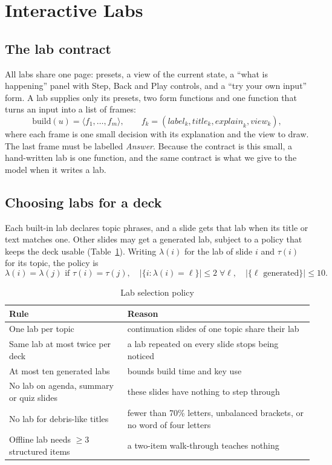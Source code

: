 \documentclass[runningheads]{llncs}
\begin{document}
\section{Interactive Labs}
\label{sec:labs}
\subsection{The lab contract}
All labs share one page: presets, a view of the current state, a ``what is happening'' panel with Step, Back and Play controls,
and a ``try your own input'' form. A lab supplies only its presets, two form functions and one function that turns an input into
a list of frames:
\begin{equation}
\mathrm{build}(u) = \langle f_1, \dots, f_m \rangle, \qquad f_k = (\mathit{label}_k, \mathit{title}_k, \mathit{explain}_k, \mathit{view}_k),
\end{equation}
where each frame is one small decision with its explanation and the view to draw. The last frame must be labelled
\emph{Answer}. Because the contract is this small, a hand-written lab is one function, and the same contract is what we give to
the model when it writes a lab.

\subsection{Choosing labs for a deck}
Each built-in lab declares topic phrases, and a slide gets that lab when its title or text matches one. Other slides may get a
generated lab, subject to a policy that keeps the deck usable (Table~\ref{tab:policy}). Writing $\lambda(i)$ for the lab of
slide $i$ and $\tau(i)$ for its topic, the policy is
\begin{equation}
\lambda(i) = \lambda(j) \text{ if } \tau(i) = \tau(j), \quad
|\{ i : \lambda(i) = \ell \}| \le 2 \;\forall \ell, \quad
|\{ \ell \text{ generated} \}| \le 10 .
\end{equation}

\begin{table}[H]
\centering
\caption{Lab selection policy}
\label{tab:policy}
\begin{tabular}{p{4.3cm}p{7.3cm}}
\toprule
Rule & Reason \\
\midrule
One lab per topic & continuation slides of one topic share their lab \\
Same lab at most twice per deck & a lab repeated on every slide stops being noticed \\
At most ten generated labs & bounds build time and key use \\
No lab on agenda, summary or quiz slides & these slides have nothing to step through \\
No lab for debris-like titles & fewer than 70\% letters, unbalanced brackets, or no word of four letters \\
Offline lab needs $\ge 3$ structured items & a two-item walk-through teaches nothing \\
\bottomrule
\end{tabular}
\end{table}
\end{document}
